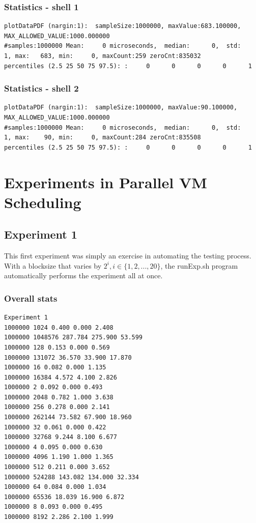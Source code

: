\documentclass{article}
\begin{document}
\subsubsection{Statistics - shell 1}

\begin{lstlisting}
plotDataPDF (nargin:1):  sampleSize:1000000, maxValue:683.100000,  MAX_ALLOWED_VALUE:1000.000000 
#samples:1000000 Mean:     0 microseconds,  median:      0,  std:      1, max:   683, min:     0, maxCount:259 zeroCnt:835032
percentiles (2.5 25 50 75 97.5): :     0      0      0      0      1
\end{lstlisting}

\subsubsection{Statistics - shell 2}

\begin{lstlisting}
plotDataPDF (nargin:1):  sampleSize:1000000, maxValue:90.100000,  MAX_ALLOWED_VALUE:1000.000000 
#samples:1000000 Mean:     0 microseconds,  median:      0,  std:      1, max:    90, min:     0, maxCount:284 zeroCnt:835508
percentiles (2.5 25 50 75 97.5): :     0      0      0      0      1
\end{lstlisting}

\section{Experiments in Parallel VM Scheduling}

\subsection{Experiment 1}

This first experiment was simply an exercise in automating the testing process.
With a blocksize that varies by $2^i, i \in \{1, 2, ..., 20\}$, the runExp.sh
program automatically performs the experiment all at once.

\subsubsection{Overall stats}

\begin{lstlisting}
Experiment 1
1000000 1024 0.400 0.000 2.408
1000000 1048576 287.784 275.900 53.599
1000000 128 0.153 0.000 0.569
1000000 131072 36.570 33.900 17.870
1000000 16 0.082 0.000 1.135
1000000 16384 4.572 4.100 2.826
1000000 2 0.092 0.000 0.493
1000000 2048 0.782 1.000 3.638
1000000 256 0.278 0.000 2.141
1000000 262144 73.582 67.900 18.960
1000000 32 0.061 0.000 0.422
1000000 32768 9.244 8.100 6.677
1000000 4 0.095 0.000 0.630
1000000 4096 1.190 1.000 1.365
1000000 512 0.211 0.000 3.652
1000000 524288 143.082 134.000 32.334
1000000 64 0.084 0.000 1.034
1000000 65536 18.039 16.900 6.872
1000000 8 0.093 0.000 0.495
1000000 8192 2.286 2.100 1.999
\end{lstlisting}
\end{document}
